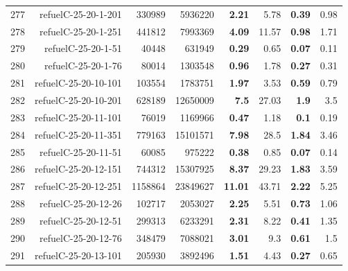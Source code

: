 \begin{longtable}{lrr@{\hskip 12pt}r@{\hskip 12pt}r@{\hskip 12pt}r@{\hskip 12pt}r@{\hskip 12pt}r}
277 & \multirow{1}{*}{refuelC-25-20-1-201} & \multirow{1}{*}{330989} & \multirow{1}{*}{5936220} & \textbf{2.21} & 5.78 & \textbf{0.39} & 0.98 \\
278 & \multirow{1}{*}{refuelC-25-20-1-251} & \multirow{1}{*}{441812} & \multirow{1}{*}{7993369} & \textbf{4.09} & 11.57 & \textbf{0.98} & 1.71 \\
279 & \multirow{1}{*}{refuelC-25-20-1-51} & \multirow{1}{*}{40448} & \multirow{1}{*}{631949} & \textbf{0.29} & 0.65 & \textbf{0.07} & 0.11 \\
280 & \multirow{1}{*}{refuelC-25-20-1-76} & \multirow{1}{*}{80014} & \multirow{1}{*}{1303548} & \textbf{0.96} & 1.78 & \textbf{0.27} & 0.31 \\
281 & \multirow{1}{*}{refuelC-25-20-10-101} & \multirow{1}{*}{103554} & \multirow{1}{*}{1783751} & \textbf{1.97} & 3.53 & \textbf{0.59} & 0.79 \\
282 & \multirow{1}{*}{refuelC-25-20-10-201} & \multirow{1}{*}{628189} & \multirow{1}{*}{12650009} & \textbf{7.5} & 27.03 & \textbf{1.9} & 3.5 \\
283 & \multirow{1}{*}{refuelC-25-20-11-101} & \multirow{1}{*}{76019} & \multirow{1}{*}{1169966} & \textbf{0.47} & 1.18 & \textbf{0.1} & 0.19 \\
284 & \multirow{1}{*}{refuelC-25-20-11-351} & \multirow{1}{*}{779163} & \multirow{1}{*}{15101571} & \textbf{7.98} & 28.5 & \textbf{1.84} & 3.46 \\
285 & \multirow{1}{*}{refuelC-25-20-11-51} & \multirow{1}{*}{60085} & \multirow{1}{*}{975222} & \textbf{0.38} & 0.85 & \textbf{0.07} & 0.14 \\
286 & \multirow{1}{*}{refuelC-25-20-12-151} & \multirow{1}{*}{744312} & \multirow{1}{*}{15307925} & \textbf{8.37} & 29.23 & \textbf{1.83} & 3.59 \\
287 & \multirow{1}{*}{refuelC-25-20-12-251} & \multirow{1}{*}{1158864} & \multirow{1}{*}{23849627} & \textbf{11.01} & 43.71 & \textbf{2.22} & 5.25 \\
288 & \multirow{1}{*}{refuelC-25-20-12-26} & \multirow{1}{*}{102717} & \multirow{1}{*}{2053027} & \textbf{2.25} & 5.51 & \textbf{0.73} & 1.06 \\
289 & \multirow{1}{*}{refuelC-25-20-12-51} & \multirow{1}{*}{299313} & \multirow{1}{*}{6233291} & \textbf{2.31} & 8.22 & \textbf{0.41} & 1.35 \\
290 & \multirow{1}{*}{refuelC-25-20-12-76} & \multirow{1}{*}{348479} & \multirow{1}{*}{7088021} & \textbf{3.01} & 9.3 & \textbf{0.61} & 1.5 \\
291 & \multirow{1}{*}{refuelC-25-20-13-101} & \multirow{1}{*}{205930} & \multirow{1}{*}{3892496} & \textbf{1.51} & 4.43 & \textbf{0.27} & 0.65 \\

\end{longtable}
